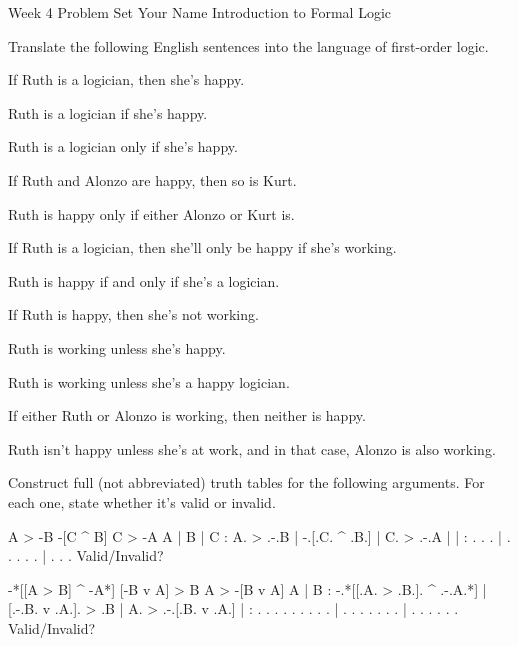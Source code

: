 

\heading
Week 4 Problem Set
Your Name
Introduction to Formal Logic
\endheading

Translate the following English sentences into the language of first-order logic.

\problems
{}
If Ruth is a logician, then she's happy.
	\answer
	$ $
	\endanswer

Ruth is a logician if she's happy.
	\answer
	$ $
	\endanswer

Ruth is a logician only if she's happy.
	\answer
	$ $
	\endanswer

If Ruth and Alonzo are happy, then so is Kurt.
	\answer
	$ $
	\endanswer

Ruth is happy only if either Alonzo or Kurt is.
	\answer
	$ $
	\endanswer

If Ruth is a logician, then she'll only be happy if she's working.
	\answer
	$ $
	\endanswer

Ruth is happy if and only if she's a logician.
	\answer
	$ $
	\endanswer

If Ruth is happy, then she's not working.
	\answer
	$ $
	\endanswer

Ruth is working unless she's happy.
	\answer
	$ $
	\endanswer

Ruth is working unless she's a happy logician.
	\answer
	$ $
	\endanswer

If either Ruth or Alonzo is working, then neither is happy.
	\answer
	$ $
	\endanswer

Ruth isn't happy unless she's at work, and in that case, Alonzo is also working.
	\answer
	$ $
	\endanswer

\endproblems

Construct full (not abbreviated) truth tables for the following arguments. For each one, state whether it's valid or invalid.

\problems
{}
\argument
 A > -B
 -[C ^ B]
\argumentline
 C > -A
\endargument
	\answer
	\truthtable
	 A | B | C : A. > .-.B | -.[.C. ^ .B.] | C. > .-.A
	\truthtableline
	   |   |   :  .   . .  |  . . .   . .  |  .   . . 
	\endtruthtable
	Valid/Invalid?
	\endanswer

\argument
 -*[[A > B] ^ -A*]
 [-B v A] > B
\argumentline
 A > -[B v A]
\endargument
	\answer
	\truthtable
	 A | B : -.*[[.A. > .B.]. ^ .-.A.*] | [.-.B. v .A.]. > .B | A. > .-.[.B. v .A.]
	\truthtableline
	   |   :  .   . .   . . .   . . .   |  . . .   . . .   .  |  .   . . . .   . 
	\endtruthtable
	Valid/Invalid?
	\endanswer

